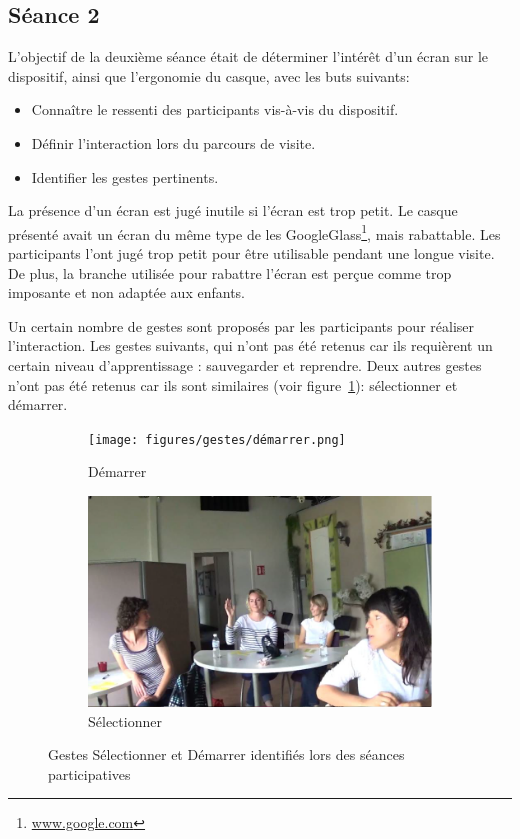  \subsection{Séance 2}

L’objectif de la deuxième séance était de déterminer l’intérêt d’un écran sur le dispositif, ainsi que l’ergonomie du casque, avec les buts suivants: 
\begin{itemize}
	\item Connaître le ressenti des participants vis-à-vis du dispositif.
	\item Définir l'interaction lors du parcours de visite.
	\item Identifier les gestes pertinents.
\end{itemize}

La présence d’un écran est jugé inutile si l’écran est trop petit. 
Le casque présenté avait un écran du même type de les GoogleGlass\footnote{\url{www.google.com}}, mais rabattable.
Les participants l’ont jugé trop petit pour être utilisable pendant une longue visite.
De plus, la branche utilisée pour rabattre l’écran est perçue comme trop imposante et non adaptée aux enfants.

Un certain nombre de gestes sont proposés par les participants pour réaliser l'interaction.
Les gestes suivants, qui n’ont pas été retenus car ils requièrent un certain niveau d’apprentissage : sauvegarder et reprendre.
Deux autres gestes n’ont pas été retenus car ils sont similaires (voir figure~\ref{fig:gestes1}): sélectionner et démarrer.


\begin{figure}%
\centering
\begin{subfigure}{0.48\textwidth}
\texttt{[image: figures/gestes/démarrer.png]}%
\caption{Démarrer}
\end{subfigure}
\begin{subfigure}{0.48\textwidth}
\includegraphics[width=\columnwidth]{figures/gestes/selectionner.png}%
\caption{Sélectionner}
\end{subfigure}

\caption{Gestes Sélectionner et Démarrer identifiés lors des séances participatives}%
\label{fig:gestes1}%
\end{figure}

